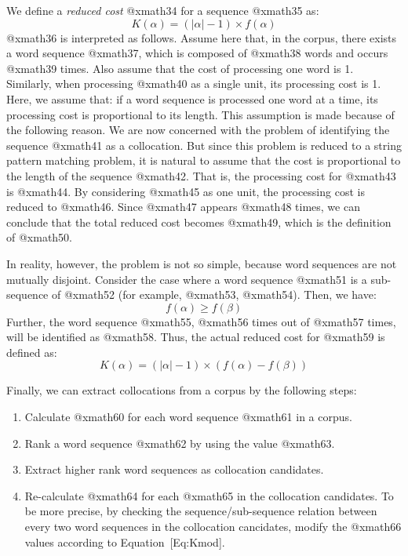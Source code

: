 We define a {\em reduced cost} @xmath34 for a sequence @xmath35 as:
\begin{equation}
        K(\alpha) = (|\alpha| - 1) \times f(\alpha)
\end{equation}
@xmath36 is interpreted as follows.
Assume here that, in the corpus, there exists a word sequence @xmath37,
which is composed of @xmath38 words and occurs @xmath39 times.
Also assume that the cost of processing one word is 1.
Similarly, when processing @xmath40 as a single unit,
its processing cost is 1.
Here, we assume that:
if a word sequence is processed one word at a time,
its processing cost is proportional to its length.
This assumption is made because of the following reason.
We are now concerned with the problem of identifying the sequence @xmath41
as a collocation.
But since this problem is reduced to a string pattern matching problem,
it is natural to assume that
the cost is proportional to the length of the sequence @xmath42.
That is, the processing cost for @xmath43 is @xmath44.
By considering @xmath45 as one unit, the processing cost is reduced
to @xmath46.
Since @xmath47 appears @xmath48 times,
we can conclude that the total reduced cost becomes
@xmath49, which is the definition of @xmath50.

In reality, however, the problem is not so simple,
because word sequences are not mutually disjoint.
Consider the case where a word sequence @xmath51 is a sub-sequence of @xmath52
(for example, @xmath53, @xmath54).
Then, we have:
\begin{equation}
        f(\alpha) \geq f(\beta)
\end{equation}
Further, the word sequence @xmath55,
@xmath56 times out of @xmath57 times, will be identified as @xmath58.
Thus, the actual reduced cost for @xmath59 is defined as:
\begin{equation}
        K(\alpha) = (|\alpha| - 1) \times (f(\alpha) - f(\beta))

\end{equation}

Finally, we can extract collocations from a corpus by the following steps:
\begin{enumerate}
\item   Calculate @xmath60 for each word sequence @xmath61 in a corpus.
\item   Rank a word sequence @xmath62 by using the value @xmath63.
\item   Extract higher rank word sequences as collocation candidates.
\item   Re-calculate @xmath64 for each @xmath65 in the collocation candidates.
To be more precise,
by checking the sequence/sub-sequence relation
between every two word sequences in the collocation cancidates,
modify the @xmath66 values according to Equation~[Eq:Kmod].
\end{enumerate}



